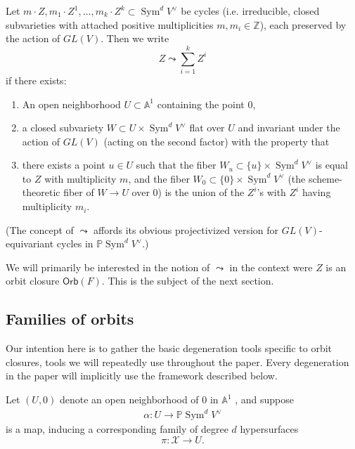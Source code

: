 \documentclass[12 pt, reqno]{amsart}
\theoremstyle{definition}
\newcommand{\on}{\operatorname}
\newcommand{\mb}{\mathbb}
\renewcommand{\P}{\mb{P}}
\newcommand{\Orb}{\mathsf{Orb}}
\begin{document}
\begin{def}
  \label{defleadsto} Let
  $m \cdot Z, m_{1} \cdot Z^{1}, \dots, m_{k} \cdot Z^{k} \subset
  \on{Sym}^dV^{\vee}$ be cycles (i.e. irreducible, closed subvarieties
  with attached positive multiplicities $m, m_{i} \in \mathbb{Z}$),
  each preserved by the action of $GL(V)$.  Then we write
  $$Z \leadsto \sum_{i=1}^{k}Z^{i}$$ if there exists:
  \begin{enumerate}
  \item An open neighborhood $U \subset \mathbb{A}^{1}$ containing the
    point $0$,
  \item a closed subvariety $W \subset U \times \on{Sym}^dV^{\vee}$
    flat over $U$ and invariant under the action of $GL(V)$ (acting on
    the second factor) with the property that

  \item there exists a point $u \in U$ such that the fiber
    $W_{u} \subset \{u\} \times \on{Sym}^dV^{\vee}$ is equal to $Z$
    with multiplicity $m$, and the fiber
    $W_{0} \subset \{0\} \times \on{Sym}^dV^{\vee}$ (the
    scheme-theoretic fiber of $W \to U$ over $0$) is the union of the
    $Z^{i}$'s with $Z^{i}$ having multiplicity $m_{i}$.
  \end{enumerate}
\end{def}

(The concept of $\leadsto$ affords its obvious projectivized version
for $GL(V)$-equivariant cycles in $\P \on{Sym}^{d}V^{\vee}$.)


We will primarily be interested in the notion of $\leadsto$ in the
context were $Z$ is an orbit closure $\Orb(F)$. This is the subject of
the next section.





\subsection{Families of orbits}
\label{degenerationsection}
Our intention here is to gather the basic degeneration tools specific
to orbit closures, tools we will repeatedly use throughout the
paper. Every degeneration in the paper will implicitly use the
framework described below.


Let $(U,0)$ denote an open neighborhood of $0$ in $\mathbb{A}^{1}$ ,
and suppose
\begin{align*}
  \alpha: U \to \P \on{Sym}^{d}V^{\vee}
\end{align*}
is a map, inducing a corresponding family of degree $d$ hypersurfaces
\[\pi: \mathcal{X} \to U.\]
\end{document}
